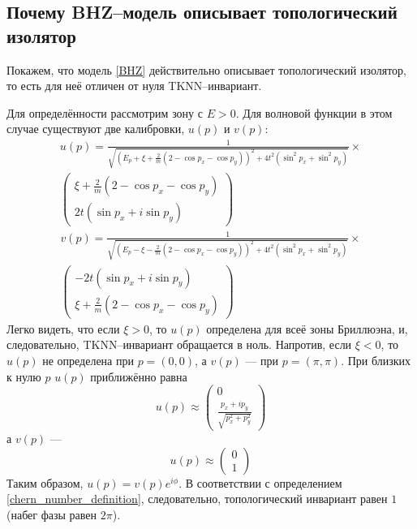 \subsection{Почему BHZ--модель описывает топологический изолятор}
Покажем, что модель \eqref{BHZ} действительно описывает топологический изолятор, то есть для
неё отличен от нуля TKNN--инвариант. 

Для определённости рассмотрим зону с $E>0$. Для волновой функции в этом случае существуют две
калибровки, $u(p)$ и $v(p)$:
\begin{multline}
    u(p) = \frac{1}{\sqrt{(E_p + \xi + \frac{2}{m}(2 - \cos{p_x} - \cos{p_y}))^2 + 
                        4t^2(\sin^2{p_x} + \sin^2{p_y})}} \times \\
                \begin{pmatrix}
                    \xi + \frac{2}{m}(2 - \cos{p_x} - \cos{p_y}) \\
                    2t(\sin{p_x} + i\sin{p_y})
                \end{pmatrix}
\end{multline}
\begin{multline}
   v(p) = \frac{1}{\sqrt{(E_p - \xi - \frac{2}{m}(2 - \cos{p_x} - \cos{p_y}))^2 + 
                        4t^2(\sin^2{p_x} + \sin^2{p_y})}} \times \\
                \begin{pmatrix}
                    -2t(\sin{p_x} + i\sin{p_y}) \\
                    \xi + \frac{2}{m}(2 - \cos{p_x} - \cos{p_y})
                \end{pmatrix}
\end{multline}
Легко видеть, что если $\xi > 0$, то $u(p)$ определена для всеё зоны Бриллюэна, и,
следовательно, TKNN--инвариант обращается в ноль. Напротив, если $\xi < 0$, то
$u(p)$ не определена при $p = (0, 0)$, а $v(p)$ --- при $p = (\pi, \pi)$. При близких 
к нулю $p$ $u(p)$ приближённо равна
\begin{equation}
    u(p) \approx \begin{pmatrix}
                    0 \\
                    \frac{p_x + ip_y}{\sqrt{p_x^2 + p_y^2}}
                 \end{pmatrix}
\end{equation}
а $v(p)$ ---    
\begin{equation}
    u(p) \approx \begin{pmatrix}
                    0 \\
                    1
                 \end{pmatrix}
\end{equation}
Таким образом, $u(p) = v(p) e^{i\phi}$. В соответствии с определением 
\eqref{chern_number_definition}, следовательно, топологический инвариант равен $1$ (набег фазы
равен $2\pi$).
